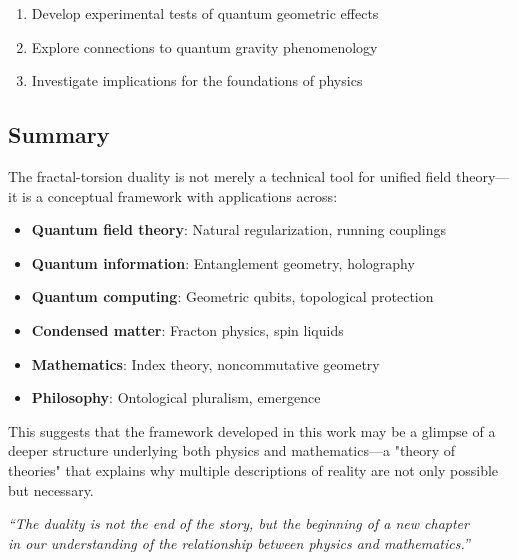 \begin{enumerate}
    \item Develop experimental tests of quantum geometric effects
    \item Explore connections to quantum gravity phenomenology
    \item Investigate implications for the foundations of physics
\end{enumerate}

\subsection{Summary}

The fractal-torsion duality is not merely a technical tool for unified field theory—it is a conceptual framework with applications across:

\begin{itemize}
    \item \textbf{Quantum field theory}: Natural regularization, running couplings
    \item \textbf{Quantum information}: Entanglement geometry, holography
    \item \textbf{Quantum computing}: Geometric qubits, topological protection
    \item \textbf{Condensed matter}: Fracton physics, spin liquids
    \item \textbf{Mathematics}: Index theory, noncommutative geometry
    \item \textbf{Philosophy}: Ontological pluralism, emergence
\end{itemize}

This suggests that the framework developed in this work may be a glimpse of a deeper structure underlying both physics and mathematics—a "theory of theories" that explains why multiple descriptions of reality are not only possible but necessary.

\begin{flushright}
\textit{``The duality is not the end of the story, but the beginning of a new chapter\\
in our understanding of the relationship between physics and mathematics.''}
\end{flushright}
